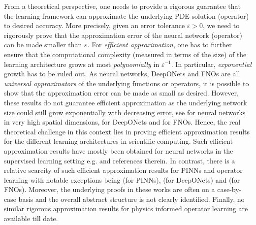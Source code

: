 \documentclass{article}
\numberwithin{equation}{section}
\renewcommand{\epsilon}{\varepsilon}
\newcommand{\1}{\mathbbm{1}}
\begin{document}
From a theoretical perspective, one needs to provide a rigorous guarantee that the learning framework can approximate the underlying PDE solution (operator) to desired accuracy. More precisely, given an error tolerance $\epsilon > 0$, we need to rigorously prove that the approximation error of the neural network (operator) can be made smaller than $\epsilon$. For \emph{efficient approximation}, one has to further ensure that the computational complexity (measured in terms of the size) of the learning architecture grows at most \emph{polynomially} in $\epsilon^{-1}$. In particular, \emph{exponential} growth has to be ruled out. As neural networks, DeepONets and FNOs are all \emph{universal approximators} \cite{cybenko1989approximation, ChenChen1995, deeponets, LMK1, kovachki2021universal} of the underlying functions or operators, it is possible to show that the approximation error can be made as small as desired. However, these results do not guarantee efficient approximation as the underlying network size could still grow exponentially with decreasing error, see \cite{yarotsky2017error} for neural networks in very high spatial dimensions, \cite{LMK1} for DeepONets and \cite{kovachki2021universal} for FNOs. Hence, the real theoretical challenge in this context lies in proving efficient approximation results for the different learning architectures in scientific computing. Such efficient approximation results have mostly been obtained for neural networks in the supervised learning setting e.g. \cite{grohs2018proof, jentzen2018proof, hutzenthaler2020proof, beck2020overcoming_elliptic, opschoor2020deep} and references therein. In contrast, there is a relative scarcity of such efficient approximation results for PINNs and operator learning with notable exceptions being  \cite{guhring2020error, deryck2021approximation, deryck2021pinn} (for PINNs), \cite{LMK1} (for DeepONets) and  \cite{kovachki2021universal} (for FNOs). Moreover, the underlying proofs in these works are often on a case-by-case basis and the overall abstract structure is not clearly identified. Finally, no similar rigorous approximation results for physics informed operator learning are available till date.
\end{document}
